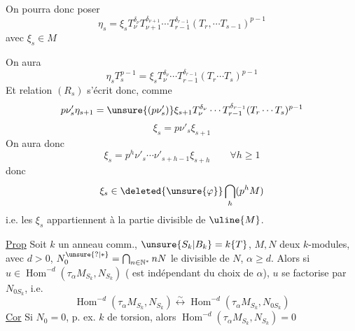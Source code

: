 On pourra donc poser
\[
\eta_s=\xi_s T_\nu^{\delta_\nu}T_{\nu+1}^{\delta_{\nu+1}}\cdots T_{r-1}^{\delta_{r-1}}(T_r,\cdots T_{s-1})^{p-1}
\]
avec $\xi_s\in M$

On aura
\[
\eta_sT_s^{p-1}=\xi_sT_\nu^{\delta_\nu}\cdots T_{r-1}^{\delta_{r-1}}(T_r\cdots T_s)^{p-1}
\]
Et relation $(R_s)$ s'écrit donc, comme
\[
p\nu'_s\eta_{s+1}=\unsure{(p\nu'_s)}\xi_{s+1}T_\nu^{\delta_\nu}\cdots T_{r-1}^{\delta_{r-1}}(T_r\cdots T_s)^{p-1}
\]
\[
\boxed{\xi_s=p\nu'_s\xi_{s+1}}
\]
On aura donc
\[
\xi_s=p^h\nu'_s\cdots\nu'_{s+h-1}\xi_{s+h}\qquad\forall h\geq1
\]
donc
\[
\xi_s\in\deleted{\unsure{\varphi}}\bigcap_h(p^hM)
\]
i.e. les $\xi_s$ appartiennent à la partie divisible de $\uline{M}$.

\uline{Prop} Soit $k$ un anneau comm., $\unsure{S_k|B_k}=k\{T\}$, $M,N$ deux $k$-modules, avec $d>0$, $N_0^{\unsure{?|*}}=\bigcap_{n\in\mathbb N^*}nN$ le   divisible de $N$, $\alpha\geq d$. Alors si $u\in\operatorname{Hom}^{-d}(\tau_\alpha M_{S_k},N_{S_k})$ (  est indépendant  du choix de $\alpha$), $u$ se factorise par $N_{0S_k}$, i.e.
\[
\operatorname{Hom}^{-d}(\tau_\alpha M_{S_k},N_{S_k})\overset{\sim}{\longleftrightarrow}\operatorname{Hom}^{-d}(\tau_\alpha M_{S_k},N_{0S_k})
\]
\uline{Cor} Si $N_0=0$, p. ex. $k$ de torsion, alors $\operatorname{Hom}^{-d}(\tau_\alpha M_{S_k},N_{S_k})=0$
